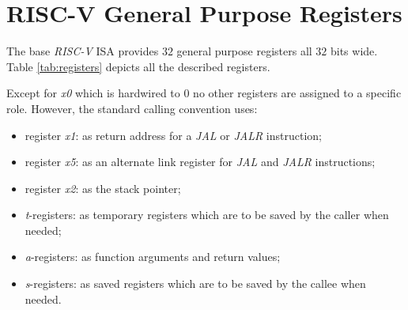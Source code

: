 \section{RISC-V General Purpose Registers}
\label{sec:riscv_reg}

The base \textit{RISC-V} ISA provides $32$ general purpose registers all $32$ bits
wide. Table \ref{tab:registers} depicts all the described registers.

Except for \textit{x0} which is hardwired to $0$ no other registers are assigned
to a specific role. However, the standard calling convention uses:
\begin{itemize}
  \item register \textit{x1}: as return address for a \textit{JAL} or \textit{JALR}
    instruction;

  \item register \textit{x5}: as an alternate link register for \textit{JAL} and
    \textit{JALR} instructions;

  \item register \textit{x2}: as the stack pointer;

  \item \textit{t}-registers: as temporary registers which are to be saved by the
    caller when needed;

  \item \textit{a}-registers: as function arguments and return values;

  \item \textit{s}-registers: as saved registers which are to be saved by the callee
    when needed.
\end{itemize}

